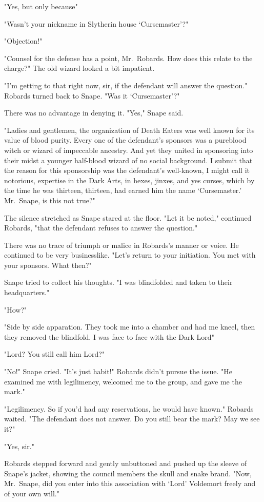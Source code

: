 "Yes, but only because{\el}"

"Wasn't your nickname in Slytherin house `Cursemaster'?"

"Objection!"

"Counsel for the defense has a point, Mr.~Robards. How does this relate to the charge?" The old wizard looked a bit impatient.

"I'm getting to that right now, sir, if the defendant will answer the question." Robards turned back to Snape. "Was it `Cursemaster'?"

There was no advantage in denying it. "Yes," Snape said.

"Ladies and gentlemen, the organization of Death Eaters was well known for its value of blood purity. Every one of the defendant's sponsors was a pureblood witch or wizard of impeccable ancestry. And yet they united in sponsoring into their midst a younger half-blood wizard of no social background. I submit that the reason for this sponsorship was the defendant's well-known, I might call it notorious, expertise in the Dark Arts, in hexes, jinxes, and yes curses, which by the time he was thirteen, thirteen, had earned him the name `Cursemaster.' Mr.~Snape, is this not true?"

The silence stretched as Snape stared at the floor. "Let it be noted," continued Robards, "that the defendant refuses to answer the question."

There was no trace of triumph or malice in Robards's manner or voice. He continued to be very businesslike. "Let's return to your initiation. You met with your sponsors. What then?"

Snape tried to collect his thoughts. "I was blindfolded and taken to their headquarters."

"How?"

"Side by side apparation. They took me into a chamber and had me kneel, then they removed the blindfold. I was face to face with the Dark Lord{\el}"

"Lord? You still call him Lord?"

"No!" Snape cried. "It's just habit!" Robards didn't pursue the issue. "He examined me with legilimency, welcomed me to the group, and gave me the mark."

"Legilimency. So if you'd had any reservations, he would have known." Robards waited. "The defendant does not answer. Do you still bear the mark? May we see it?"

"Yes, sir."

Robards stepped forward and gently unbuttoned and pushed up the sleeve of Snape's jacket, showing the council members the skull and snake brand. "Now, Mr.~Snape, did you enter into this association with `Lord' Voldemort freely and of your own will."

